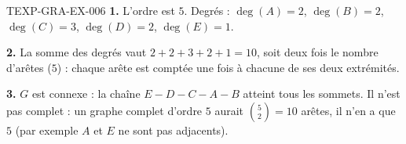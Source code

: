\begin{corrige}{TEXP-GRA-EX-006}
\textbf{1.} L'ordre est $5$. Degrés : $\deg(A)=2$, $\deg(B)=2$, $\deg(C)=3$,
$\deg(D)=2$, $\deg(E)=1$.

\textbf{2.} La somme des degrés vaut $2+2+3+2+1=10$, soit deux fois le nombre
d'arêtes ($5$) : chaque arête est comptée une fois à chacune de ses deux
extrémités.

\textbf{3.} $G$ est connexe : la chaîne $E-D-C-A-B$ atteint tous les sommets.
Il n'est pas complet : un graphe complet d'ordre $5$ aurait
$\binom{5}{2}=10$ arêtes, il n'en a que $5$ (par exemple $A$ et $E$ ne sont pas
adjacents).
\end{corrige}
